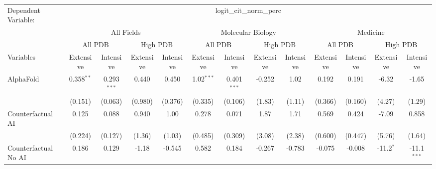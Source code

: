 \begingroup
\centering
\begin{tabular}{lcccccccccccc}
   \tabularnewline \midrule \midrule
   Dependent Variable: & \multicolumn{12}{c}{logit\_cit\_norm\_perc}\\
 & \multicolumn{4}{c}{All Fields} & \multicolumn{4}{c}{Molecular Biology} & \multicolumn{4}{c}{Medicine} \\
\cmidrule(lr){2-5} \cmidrule(lr){6-9} \cmidrule(lr){10-13}
 & \multicolumn{2}{c}{All PDB} & \multicolumn{2}{c}{High PDB} & \multicolumn{2}{c}{All PDB} & \multicolumn{2}{c}{High PDB} & \multicolumn{2}{c}{All PDB} & \multicolumn{2}{c}{High PDB} \\
\cmidrule(lr){2-3} \cmidrule(lr){4-5} \cmidrule(lr){6-7} \cmidrule(lr){8-9} \cmidrule(lr){10-11} \cmidrule(lr){12-13}
Variables & \multicolumn{1}{c}{Extensive} & \multicolumn{1}{c}{Intensive} & \multicolumn{1}{c}{Extensive} & \multicolumn{1}{c}{Intensive} & \multicolumn{1}{c}{Extensive} & \multicolumn{1}{c}{Intensive} & \multicolumn{1}{c}{Extensive} & \multicolumn{1}{c}{Intensive} & \multicolumn{1}{c}{Extensive} & \multicolumn{1}{c}{Intensive} & \multicolumn{1}{c}{Extensive} & \multicolumn{1}{c}{Intensive} \\
\cmidrule(lr){1-1}\cmidrule(lr){2-2} \cmidrule(lr){3-3} \cmidrule(lr){4-4} \cmidrule(lr){5-5} \cmidrule(lr){6-6} \cmidrule(lr){7-7} \cmidrule(lr){8-8} \cmidrule(lr){9-9} \cmidrule(lr){10-10} \cmidrule(lr){11-11} \cmidrule(lr){12-12} \cmidrule(lr){13-13}
   AlphaFold                                & 0.358$^{**}$ & 0.293$^{***}$ & 0.440        & 0.450        & 1.02$^{***}$ & 0.401$^{***}$ & -0.252        & 1.02          & 0.192       & 0.191        & -6.32       & -1.65\\   
                                            & (0.151)      & (0.063)       & (0.980)      & (0.376)      & (0.335)      & (0.106)       & (1.83)        & (1.11)        & (0.366)     & (0.160)      & (4.27)      & (1.29)\\   
   Counterfactual AI                        & 0.125        & 0.088         & 0.940        & 1.00         & 0.278        & 0.071         & 1.87          & 1.71          & 0.569       & 0.424        & -7.09       & 0.858\\   
                                            & (0.224)      & (0.127)       & (1.36)       & (1.03)       & (0.485)      & (0.309)       & (3.08)        & (2.38)        & (0.600)     & (0.447)      & (5.76)      & (1.64)\\   
   Counterfactual No AI                     & 0.186        & 0.129         & -1.18        & -0.545       & 0.582        & 0.184         & -0.267        & -0.783        & -0.075      & -0.008       & -11.2$^{*}$ & -11.1$^{***}$\\   

\end{tabular}
